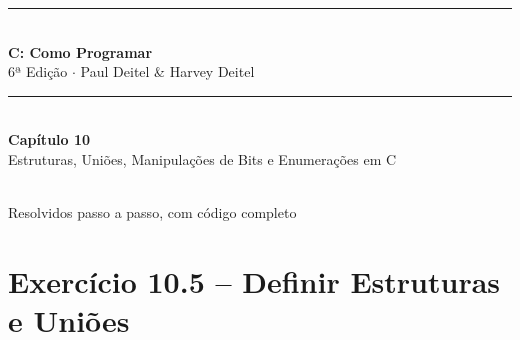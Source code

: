 \documentclass[12pt,a4paper]{article}
\begin{document}
\begin{titlepage}
  \centering\vspace*{2cm}
  {\color{deitelblue}\rule{\linewidth}{2pt}}\\[0.4cm]
  {\huge\bfseries\color{deitelblue}C: Como Programar}\\[0.2cm]
  {\large\color{deitelblue}6ª Edição $\cdot$ Paul Deitel \& Harvey Deitel}\\[0.2cm]
  {\color{deitelblue}\rule{\linewidth}{2pt}}\\[1cm]
  {\LARGE\bfseries Capítulo 10}\\[0.3cm]
  {\Large\color{deitelblue!80}Estruturas, Uniões, Manipulações de Bits e Enumerações em C}\\[0.8cm]
  \begin{tcolorbox}[colback=deitellightblue,colframe=deitelblue,width=0.85\linewidth]
    \\[0.2cm]
    {\normalsize Resolvidos passo a passo, com código completo}
  \end{tcolorbox}
\end{titlepage}

\tableofcontents\newpage

\section{Exercício 10.5 -- Definir Estruturas e Uniões}
\end{document}
